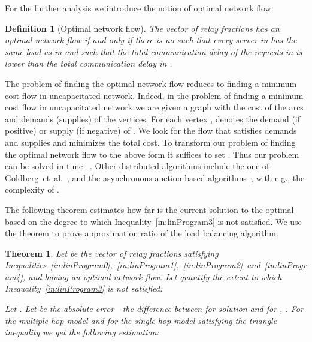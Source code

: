 \documentclass[11pt]{article}
\newtheorem{theorem}{Theorem}
\newtheorem{definition}{Definition}
\begin{document}
For the further analysis we introduce the notion of optimal network flow.

\begin{definition}[Optimal network flow]
The vector of relay fractions  has an optimal network flow if and only if there is no  such that every server in  has the same load as in  and such that the total communication delay of the requests  in  is lower than the total communication delay  in .
\end{definition} 

The problem of finding the optimal network flow reduces to finding a minimum cost flow in uncapacitated network.
Indeed, in the problem of finding a minimum cost flow in uncapacitated network we are given a graph with the cost of the arcs and demands (supplies) of the vertices. For each vertex ,  denotes the demand (if positive) or supply (if negative) of . We look for the flow that satisfies demands and supplies and minimizes the total cost. To transform our problem of finding the optimal network flow to the above form it suffices to set . 
Thus our problem can be solved in time ~\cite{Orlin88afaster}. Other distributed algorithms include the one of Goldberg~et~al.~\cite{minimumCirculation}, and the asynchronous auction-based algorithms~\cite{auctionBasedMinCostFlow}, with e.g., the complexity of .

The following theorem estimates how far is the current solution to the optimal based on the degree to which Inequality~\ref{in:linProgram3} is not satisfied. We use the theorem to prove approximation ratio of the load balancing algorithm.

\begin{theorem}\label{thm:approxBound}
Let  be the vector of relay fractions satisfying Inequalities~\ref{in:linProgram0},~\ref{in:linProgram1},~\ref{in:linProgram2}~and~\ref{in:linProgram4}, and having an optimal network flow. Let  quantify the extent to which Inequality~\ref{in:linProgram3} is not satisfied:

Let .
Let  be the absolute error---the difference between  for solution  and for  , .
For the multiple-hop model and for the single-hop model satisfying the triangle inequality we get the following estimation:

\end{theorem}
\end{document}
